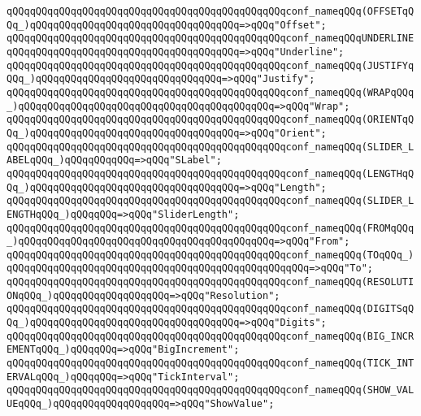 \verb|qQQqqQQqqQQqqQQqqQQqqQQqqQQqqQQqqQQqqQQqqQQqqQQqconf_nameqQQq(OFFSETqQQq_)qQQqqQQqqQQqqQQqqQQqqQQqqQQqqQQqqQQq=>qQQq"Offset";|\newline
\verb|qQQqqQQqqQQqqQQqqQQqqQQqqQQqqQQqqQQqqQQqqQQqqQQqconf_nameqQQqUNDERLINEqQQqqQQqqQQqqQQqqQQqqQQqqQQqqQQqqQQqqQQq=>qQQq"Underline";|\newline
\verb|qQQqqQQqqQQqqQQqqQQqqQQqqQQqqQQqqQQqqQQqqQQqqQQqconf_nameqQQq(JUSTIFYqQQq_)qQQqqQQqqQQqqQQqqQQqqQQqqQQqqQQq=>qQQq"Justify";|\newline
\verb|qQQqqQQqqQQqqQQqqQQqqQQqqQQqqQQqqQQqqQQqqQQqqQQqconf_nameqQQq(WRAPqQQq_)qQQqqQQqqQQqqQQqqQQqqQQqqQQqqQQqqQQqqQQqqQQq=>qQQq"Wrap";|\newline
\verb|qQQqqQQqqQQqqQQqqQQqqQQqqQQqqQQqqQQqqQQqqQQqqQQqconf_nameqQQq(ORIENTqQQq_)qQQqqQQqqQQqqQQqqQQqqQQqqQQqqQQqqQQq=>qQQq"Orient";|\newline
\verb|qQQqqQQqqQQqqQQqqQQqqQQqqQQqqQQqqQQqqQQqqQQqqQQqconf_nameqQQq(SLIDER_LABELqQQq_)qQQqqQQqqQQq=>qQQq"SLabel";|\newline
\verb|qQQqqQQqqQQqqQQqqQQqqQQqqQQqqQQqqQQqqQQqqQQqqQQqconf_nameqQQq(LENGTHqQQq_)qQQqqQQqqQQqqQQqqQQqqQQqqQQqqQQqqQQq=>qQQq"Length";|\newline
\verb|qQQqqQQqqQQqqQQqqQQqqQQqqQQqqQQqqQQqqQQqqQQqqQQqconf_nameqQQq(SLIDER_LENGTHqQQq_)qQQqqQQq=>qQQq"SliderLength";|\newline
\verb|qQQqqQQqqQQqqQQqqQQqqQQqqQQqqQQqqQQqqQQqqQQqqQQqconf_nameqQQq(FROMqQQq_)qQQqqQQqqQQqqQQqqQQqqQQqqQQqqQQqqQQqqQQqqQQq=>qQQq"From";|\newline
\verb|qQQqqQQqqQQqqQQqqQQqqQQqqQQqqQQqqQQqqQQqqQQqqQQqconf_nameqQQq(TOqQQq_)qQQqqQQqqQQqqQQqqQQqqQQqqQQqqQQqqQQqqQQqqQQqqQQqqQQq=>qQQq"To";|\newline
\verb|qQQqqQQqqQQqqQQqqQQqqQQqqQQqqQQqqQQqqQQqqQQqqQQqconf_nameqQQq(RESOLUTIONqQQq_)qQQqqQQqqQQqqQQqqQQq=>qQQq"Resolution";|\newline
\verb|qQQqqQQqqQQqqQQqqQQqqQQqqQQqqQQqqQQqqQQqqQQqqQQqconf_nameqQQq(DIGITSqQQq_)qQQqqQQqqQQqqQQqqQQqqQQqqQQqqQQqqQQq=>qQQq"Digits";|\newline
\verb|qQQqqQQqqQQqqQQqqQQqqQQqqQQqqQQqqQQqqQQqqQQqqQQqconf_nameqQQq(BIG_INCREMENTqQQq_)qQQqqQQq=>qQQq"BigIncrement";|\newline
\verb|qQQqqQQqqQQqqQQqqQQqqQQqqQQqqQQqqQQqqQQqqQQqqQQqconf_nameqQQq(TICK_INTERVALqQQq_)qQQqqQQq=>qQQq"TickInterval";|\newline
\verb|qQQqqQQqqQQqqQQqqQQqqQQqqQQqqQQqqQQqqQQqqQQqqQQqconf_nameqQQq(SHOW_VALUEqQQq_)qQQqqQQqqQQqqQQqqQQq=>qQQq"ShowValue";|\newline

